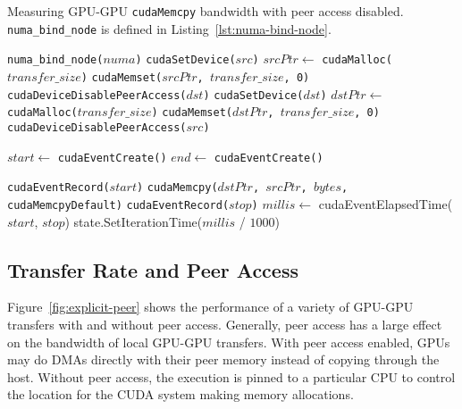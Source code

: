 \begin{algorithm}[H]
	\caption[Measuring GPU-GPU \texttt{cudaMemcpy} non-peer bandwidth]{
		Measuring GPU-GPU \texttt{cudaMemcpy} bandwidth with peer access disabled.
		\texttt{numa\_bind\_node} is defined in Listing~\ref{lst:numa-bind-node}.}
	\label{alg:explicit-gpu-gpu-nopeer}
	\begin{algorithmic}[1]
		\Statex

		\State \texttt{numa\_bind\_node($numa$)}
		\State \texttt{cudaSetDevice($src$)}
		\State $srcPtr \gets$ \texttt{cudaMalloc($transfer\_size$)} 
		\State \texttt{cudaMemset($srcPtr$, $transfer\_size$, 0)}
		\State \texttt{cudaDeviceDisablePeerAccess($dst$)}
		\State \texttt{cudaSetDevice($dst$)}
		\State $dstPtr \gets$ \texttt{cudaMalloc($transfer\_size$)} 
		\State \texttt{cudaMemset($dstPtr$, $transfer\_size$, 0)}
		\State \texttt{cudaDeviceDisablePeerAccess($src$)}
		
		\State $start \gets$ \texttt{cudaEventCreate()}
		\State $end \gets$ \texttt{cudaEventCreate()}

		\State \texttt{cudaEventRecord($start$)}
		\State \texttt{cudaMemcpy($dstPtr$, $srcPtr$, $bytes$, cudaMemcpyDefault)}
		\State \texttt{cudaEventRecord($stop$)}
		\State $millis \gets$ cudaEventElapsedTime($start$, $stop$)
		\State state.SetIterationTime($millis$ / $1000$)
        \EndFor
		
		\EndFunction
		
	\end{algorithmic}
\end{algorithm}

\subsection{Transfer Rate and Peer Access}
\label{sec:explicit-peer-bandwidth}

Figure~\ref{fig:explicit-peer} shows the performance of a variety of GPU-GPU transfers with and without peer access.
Generally, peer access has a large effect on the bandwidth of local GPU-GPU transfers.
With peer access enabled, GPUs may do DMAs directly with their peer memory instead of copying through the host.
Without peer access, the execution is pinned to a particular CPU to control the location for the CUDA system making memory allocations.

